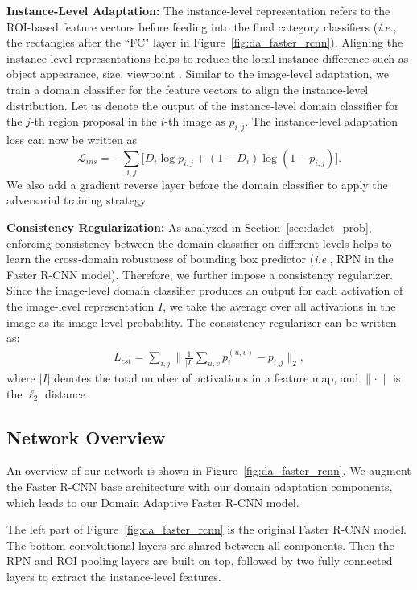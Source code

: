 \documentclass[10pt,twocolumn,letterpaper]{article}
\def\ie{\emph{i.e.}}
\def\cL{\mathcal{L}}
\begin{document}
\textbf{Instance-Level Adaptation: } The instance-level representation refers to the ROI-based feature vectors before feeding into the final category classifiers (\ie, the rectangles after the ``FC" layer in Figure~\ref{fig:da_faster_rcnn}). Aligning the instance-level representations helps to reduce the local instance difference such as object appearance, size, viewpoint \etc. Similar to the image-level adaptation, we train a domain classifier for the feature vectors to align the instance-level distribution. Let us denote the output of the instance-level domain classifier for the $j$-th region proposal in the $i$-th image as $p_{i, j}$. The instance-level adaptation loss can now be written as
\begin{equation}
\cL_{ins} = -\sum_{i,j}\Big[D_i\log p_{i,j} + (1-D_i)\log(1- p_{i,j})\Big].
\end{equation}
We also add a gradient reverse layer before the domain classifier to apply the adversarial training strategy. 

\textbf{Consistency Regularization: } As analyzed in Section~\ref{sec:dadet_prob}, enforcing consistency between the domain classifier on different levels helps to learn the cross-domain robustness of bounding box predictor (\ie, RPN in the Faster R-CNN model). Therefore, we further impose a consistency regularizer. Since the image-level domain classifier produces an output for each activation of the image-level representation $I$, we take the average over all activations in the image as its image-level probability. The consistency regularizer can be written as: 
\begin{eqnarray}
L_{cst} = \sum_{i,j} \|\frac{1}{|I|}\sum_{u,v}p_{i}^{(u,v)} - p_{i,j} \|_2,
\end{eqnarray}
where $|I|$ denotes the total number of activations in a feature map, and $\|\cdot\|$ is the $\ell_2$ distance. 

\subsection{Network Overview}
An overview of our network is shown in Figure~\ref{fig:da_faster_rcnn}. We augment the Faster R-CNN base architecture with our domain adaptation components, which leads to our Domain Adaptive Faster R-CNN model.

The left part of Figure~\ref{fig:da_faster_rcnn} is the original Faster R-CNN model. The bottom convolutional layers are shared between all components. Then the RPN and ROI pooling layers are built on top, followed by two fully connected layers to extract the instance-level features. 
\end{document}
